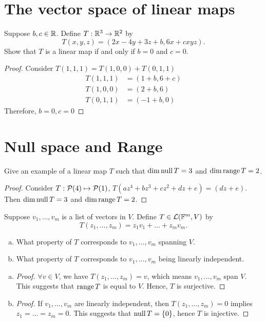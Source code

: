 \section{The vector space of linear maps}

\begin{exercise}
Suppose \(b,c \in \mathbb{R}\). Define \(T : \mathbb{R}^3 \to \mathbb{R}^2\) by \[
	T(x,y,z) = ( 2x - 4y + 3z + b, 6x + cxyz).\]
Show that $T$ is a linear map if and only if \(b = 0\) and \(c = 0\).
\end{exercise}

\begin{proof}
	Consider \(T(1,1,1) = T(1,0,0) + T(0,1,1)\)
	\begin{align*}
		T(1,1,1) & = (1 + b, 6 + c) \\
		T(1,0,0) & = (2 + b, 6)     \\
		T(0,1,1) & = (-1 + b, 0)
	\end{align*}
	Therefore, \(b=0, c=0\)
\end{proof}

\section{Null space and Range}

\begin{exercise}
Give an example of a linear map $T$ such that \(\dim \mathop{\mathrm{null}} T = 3\) and \(\dim \mathop{\mathrm{range}} T = 2\).
\end{exercise}

\begin{proof}
	Consider \(T : \mathcal{P} (4) \mapsto \mathcal{P} (1)\), \(T(a z^4 +b z^3 + c z^2 + d z + e) = (d z + e)\). Then \(\dim \mathop{\mathrm{null}} T = 3\) and \(\dim \mathop{\mathrm{range}} T = 2\).
\end{proof}

\begin{exercise}
Suppose \(v_1 , \dots, v_m\) is a list of vectors in $V$. Define \(T \in \mathcal{L}(\mathbb{F}^m, V)\) by \[
	T(z_1, \dots, z_m) = z_1v_1 + \dots + z_mv_m.\]
\begin{enumerate}[(a)]
	\item What property of $T$ corresponds to \(v_1, \dots, v_m\) spanning $V$.
	\item What property of $T$ corresponds to \(v_1, \dots, v_m\) being linearly independent.
\end{enumerate}
\end{exercise}

\begin{enumerate}[(a)]
	\item \begin{proof}
		      \(\forall v \in V\), we have \(T(z_1, \dots, z_m) = v\), which means \(v_1, \dots, v_m\) span $V$. This suggests that $\mathop{\mathrm{range}} T$ is equal to $V$. Hence, $T$ is surjective.
	      \end{proof}
	\item \begin{proof}
		      If \(v_1, \dots, v_m\) are linearly independent, then \(T(z_1, \dots, z_m) = 0\) implies \(z_1 = \dots = z_m = 0\). This suggests that $\mathop{\mathrm{null}} T = \{0\}$, hence $T$ is injective.
	      \end{proof}
\end{enumerate}


